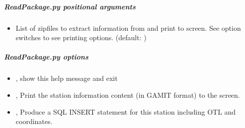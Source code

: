 \documentclass[letterpaper,10pt,english]{sphinxmanual}
\begin{document}
\begin{sphinxVerbatim}[commandchars=\\\{\}]
 \PYG{p}{[}\PYG{p}{]} \PYG{p}{[}\PYG{p}{]} \PYG{p}{[}\PYG{p}{]}  \PYG{p}{[} \PYG{p}{]}
\end{sphinxVerbatim}


\subparagraph{ReadPackage.py positional arguments}
\label{\detokenize{pgamit.com:ReadPackage.py-positional-arguments}}\begin{itemize}
\item {} 
\sphinxAtStartPar
{\hyperref[\detokenize{pgamit.com:ReadPackage.py-zipfiles}]{}} \sphinxhyphen{} List of zipfiles to extract information from and print to screen. See option switches to see printing options. (default: )

\end{itemize}


\subparagraph{ReadPackage.py options}
\label{\detokenize{pgamit.com:ReadPackage.py-options}}\begin{itemize}
\item {} 
\sphinxAtStartPar
{\hyperref[\detokenize{pgamit.com:ReadPackage.py--h}]{}}, {\hyperref[\detokenize{pgamit.com:ReadPackage.py---help}]{}} \sphinxhyphen{} show this help message and exit

\item {} 
\sphinxAtStartPar
{\hyperref[\detokenize{pgamit.com:ReadPackage.py--stninfo}]{}}, {\hyperref[\detokenize{pgamit.com:ReadPackage.py---station_info}]{}} \sphinxhyphen{} Print the station information content (in GAMIT format) to the screen.

\item {} 
\sphinxAtStartPar
{\hyperref[\detokenize{pgamit.com:ReadPackage.py--ins}]{}}, {\hyperref[\detokenize{pgamit.com:ReadPackage.py---insert_sql}]{}} \sphinxhyphen{} Produce a SQL INSERT statement for this station including OTL and coordinates.

\end{itemize}
\end{document}

